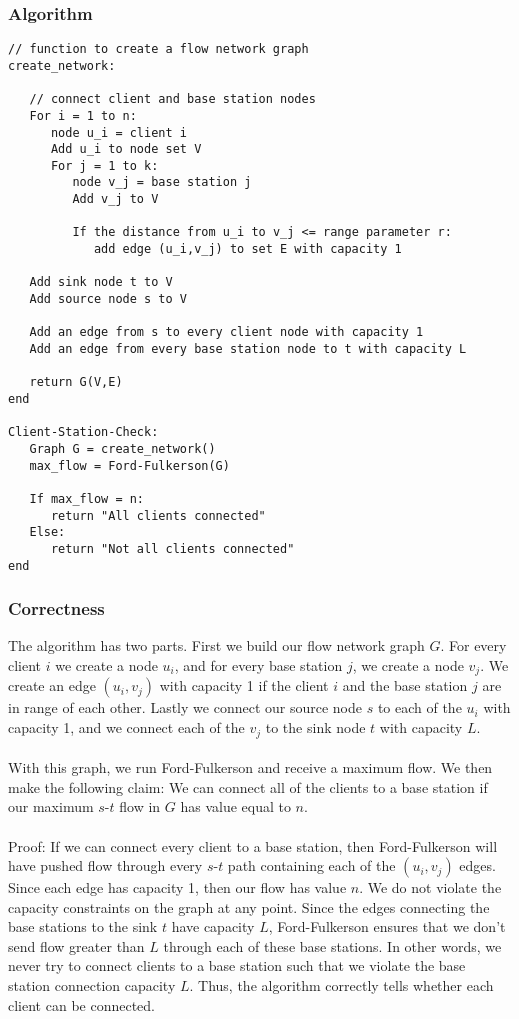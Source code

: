 \documentclass[12pt, oneside]{article}
\begin{document}
\subsubsection*{Algorithm}
\begin{verbatim}
// function to create a flow network graph
create_network:
   
   // connect client and base station nodes
   For i = 1 to n:
      node u_i = client i
      Add u_i to node set V
      For j = 1 to k:
         node v_j = base station j
         Add v_j to V
         
         If the distance from u_i to v_j <= range parameter r:
            add edge (u_i,v_j) to set E with capacity 1
         
   Add sink node t to V
   Add source node s to V
   
   Add an edge from s to every client node with capacity 1
   Add an edge from every base station node to t with capacity L
   
   return G(V,E)
end

Client-Station-Check:
   Graph G = create_network()
   max_flow = Ford-Fulkerson(G)
   
   If max_flow = n:
      return "All clients connected"
   Else:
      return "Not all clients connected"
end
\end{verbatim}

\subsubsection*{Correctness}
The algorithm has two parts. First we build our flow network graph $G$. For every client $i$ we create a node $u_i$, and for every base station $j$, we create a node $v_j$. We create an edge $(u_i,v_j)$ with capacity 1 if the client $i$ and the base station $j$ are in range of each other. Lastly we connect our source node $s$ to each of the $u_i$ with capacity 1, and we connect each of the $v_j$ to the sink node $t$ with capacity $L$.\\\\
With this graph, we run Ford-Fulkerson and receive a maximum flow. We then make the following claim: We can connect all of the clients to a base station if our maximum $s$-$t$ flow in $G$ has value equal to $n$.\\\\
Proof: If we can connect every client to a base station, then Ford-Fulkerson will have pushed flow through every $s$-$t$ path containing each of the $(u_i,v_j)$ edges. Since each edge has capacity 1, then our flow has value $n$. We do not violate the capacity constraints on the graph at any point. Since the edges connecting the base stations to the sink $t$ have capacity $L$, Ford-Fulkerson ensures that we don't send flow greater than $L$ through each of these base stations. In other words, we never try to connect clients to a base station such that we violate the base station connection capacity $L$. Thus, the algorithm correctly tells whether each client can be connected.\\
\end{document}
